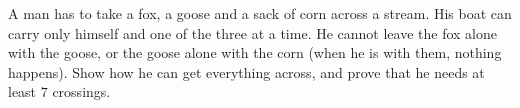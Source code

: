 A man has to take a fox, a goose and a sack of corn across a stream. His boat can carry only himself and one of the three at a time. He cannot leave the fox alone with the goose, or the goose alone with the corn (when he is with them, nothing happens). Show how he can get everything across, and prove that he needs at least $7$ crossings.
